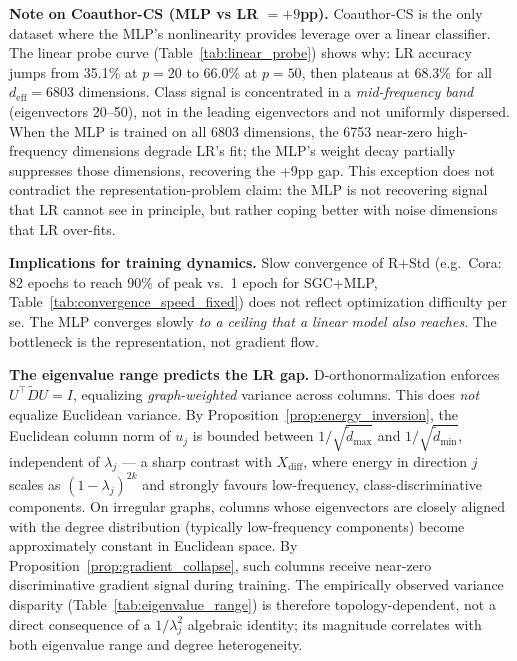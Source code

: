 \documentclass[11pt]{article}
\begin{document}
\noindent\textbf{Note on Coauthor-CS (MLP vs LR $= +9$pp).}
Coauthor-CS is the only dataset where the MLP's nonlinearity provides leverage over
a linear classifier.  The linear probe curve (Table~\ref{tab:linear_probe}) shows why:
LR accuracy jumps from 35.1\% at $p{=}20$ to 66.0\% at $p{=}50$, then plateaus at
68.3\% for all $d_{\mathrm{eff}}{=}6803$ dimensions.  Class signal is concentrated in
a \emph{mid-frequency band} (eigenvectors 20--50), not in the leading eigenvectors and
not uniformly dispersed.  When the MLP is trained on all 6803 dimensions, the 6753
near-zero high-frequency dimensions degrade LR's fit; the MLP's weight decay partially
suppresses those dimensions, recovering the +9pp gap.  This exception does not
contradict the representation-problem claim: the MLP is not recovering signal that LR
cannot see in principle, but rather coping better with noise dimensions that LR
over-fits.

\noindent\textbf{Implications for training dynamics.}
Slow convergence of R+Std (e.g.\ Cora: 82 epochs to reach 90\% of peak vs.\ 1 epoch
for SGC+MLP, Table~\ref{tab:convergence_speed_fixed}) does not reflect optimization
difficulty per se.  The MLP converges slowly \emph{to a ceiling that a linear model
also reaches}.  The bottleneck is the representation, not gradient flow.

\noindent\textbf{The eigenvalue range predicts the LR gap.}
D-orthonormalization enforces $U^\top \tilde{D} U = I$, equalizing
\emph{graph-weighted} variance across columns.
This does \emph{not} equalize Euclidean variance.
By Proposition~\ref{prop:energy_inversion}, the Euclidean column norm of $u_j$
is bounded between $1/\sqrt{\tilde{d}_{\max}}$ and $1/\sqrt{\tilde{d}_{\min}}$,
independent of $\lambda_j$ --- a sharp contrast with $X_{\mathrm{diff}}$, where
energy in direction $j$ scales as $(1{-}\lambda_j)^{2k}$ and strongly favours
low-frequency, class-discriminative components.
On irregular graphs, columns whose eigenvectors are closely aligned with the
degree distribution (typically low-frequency components) become approximately
constant in Euclidean space.
By Proposition~\ref{prop:gradient_collapse}, such columns receive near-zero
discriminative gradient signal during training.
The empirically observed variance disparity (Table~\ref{tab:eigenvalue_range})
is therefore topology-dependent, not a direct consequence of a $1/\lambda_j^2$
algebraic identity; its magnitude correlates with both eigenvalue range and
degree heterogeneity.
\end{document}
